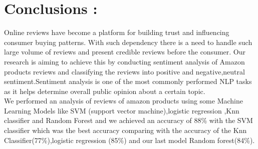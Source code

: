 \documentclass{article}
\begin{document}
\newpage
\section*{Conclusions : }
\qquad Online reviews have become a platform for building trust and influencing consumer buying patterns. With such dependency there is a need to handle such large volume of reviews and present credible reviews before the consumer. Our research is aiming to achieve this by conducting sentiment analysis of Amazon products reviews and classifying the reviews into positive and negative,neutral sentiment.Sentiment analysis is one of the most commonly performed NLP tasks as it helps determine overall public opinion about a certain topic.
\\
We performed an analysis of reviews of amazon products using some Machine Learning Models  like SVM (support vector machine),logistic regression ,Knn classifier and Random Forest and we achieved an accuracy of 88\% with the SVM  classifier which was the best accuracy comparing with the accuracy of the Knn Classifier(77\%),logistic regression (85\%) and our last model Random forest(84\%).
\end{document}
